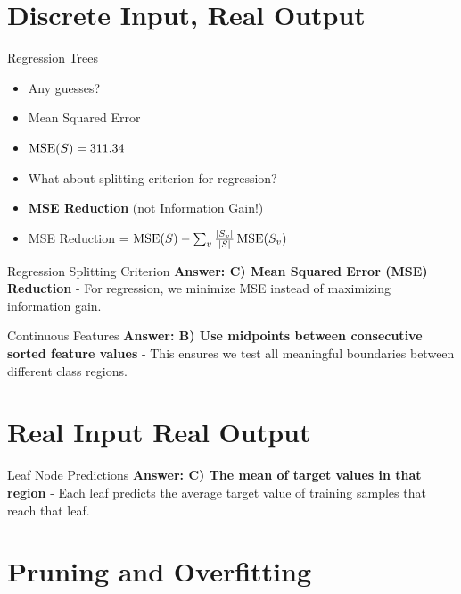 \documentclass[usenames,dvipsnames]{beamer}
\begin{document}
\section{Discrete Input, Real Output}

\begin{frame}{Regression Trees}
\begin{itemize}
\item Any guesses?
	\item \pause Mean Squared Error
	\item \pause $\operatorname{MSE}(S) = 311.34$
	\item \pause What about splitting criterion for regression?
	\item \pause \textbf{MSE Reduction} (not Information Gain!)
	\item \pause MSE Reduction = $\operatorname{MSE}(S) - \sum_{v} \frac{|S_v|}{|S|} \operatorname{MSE}(S_v)$
\end{itemize}
\end{frame}

\begin{frame}{Regression Splitting Criterion}
\textbf{Answer: C) Mean Squared Error (MSE) Reduction} - For regression, we minimize MSE instead of maximizing information gain.
\end{frame}

\begin{frame}{Continuous Features}
\textbf{Answer: B) Use midpoints between consecutive sorted feature values} - This ensures we test all meaningful boundaries between different class regions.
\end{frame}

\section{Real Input Real Output}

\begin{frame}{Leaf Node Predictions}
\textbf{Answer: C) The mean of target values in that region} - Each leaf predicts the average target value of training samples that reach that leaf.
\end{frame}

\section{Pruning and Overfitting}
\end{document}
